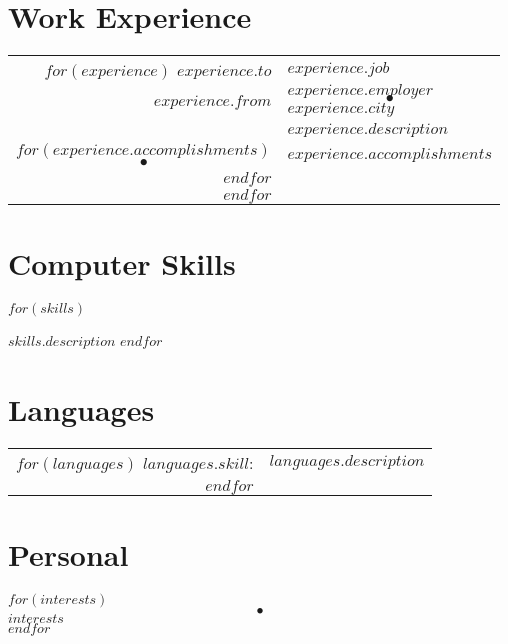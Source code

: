 \documentclass[a4paper,10pt]{article}
\begin{document}
\section{Work Experience}

\begin{tabular}{r|p{14cm}}
$for(experience)$
$experience.to$   & $experience.job$\\
$experience.from$ & \textsc{$experience.employer$}\textcolor{lightcomment}{$$~~\bullet~~$$}\textcolor{comment}{$experience.city$} \\
                  & \footnotesize{\textsf{\textbf{$experience.description$}} }\\
$for(experience.accomplishments)$ 
\textcolor{lightcomment}{$$\bullet$$} & \footnotesize{\textsf{$experience.accomplishments$}}\\
$endfor$
\multicolumn{2}{c}{} \\
$endfor$
\end{tabular}

\begin{multicols}{2}
\section{Computer Skills}
\begin{description}
$for(skills)$
\item[$skills.skill$]\textsf{$skills.description$}
$endfor$
\end{description}


\section{Languages}
\begin{tabular}{rl}
$for(languages)$
\textsc{$languages.skill$:} & $languages.description$\\
$endfor$
\end{tabular}
\end{multicols}


\section{Personal}
$for(interests)$
\textcolor{lightcomment}{$$~~\bullet~~$$}\textsf{$interests$}\\
$endfor$
\end{document}
